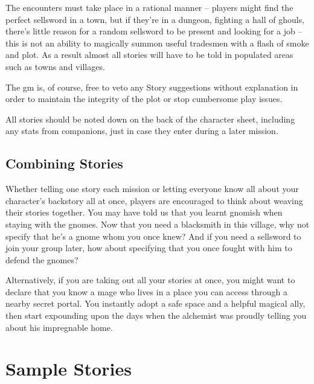 \begin{multicols}{2}
The encounters must take place in a rational manner -- players might find the perfect sellsword in a town, but if they're in a dungeon, fighting a hall of ghouls, there's little reason for a random sellsword to be present and looking for a job -- this is not an ability to magically summon useful tradesmen with a flash of smoke and plot.
As a result almost all stories will have to be told in populated areas such as towns and villages.

The \gls{gm} is, of course, free to veto any Story suggestions without explanation in order to maintain the integrity of the plot or stop cumbersome play issues.

All stories should be noted down on the back of the character sheet, including any stats from companions, just in case they enter during a later mission.

\subsection{Combining Stories}

Whether telling one story each mission or letting everyone know all about your character's backstory all at once, players are encouraged to think about weaving their stories together.
You may have told us that you learnt gnomish when staying with the gnomes.
Now that you need a blacksmith in this village, why not specify that he's a gnome whom you once knew?
And if you need a sellsword to join your group later, how about specifying that you once fought with him to defend the gnomes?

Alternatively, if you are taking out all your stories at once, you might want to declare that you know a mage who lives in a place you can access through a nearby secret portal.
You instantly adopt a safe space and a helpful magical ally, then start expounding upon the days when the alchemist was proudly telling you about his impregnable home.

\end{multicols}

\section{Sample Stories}

